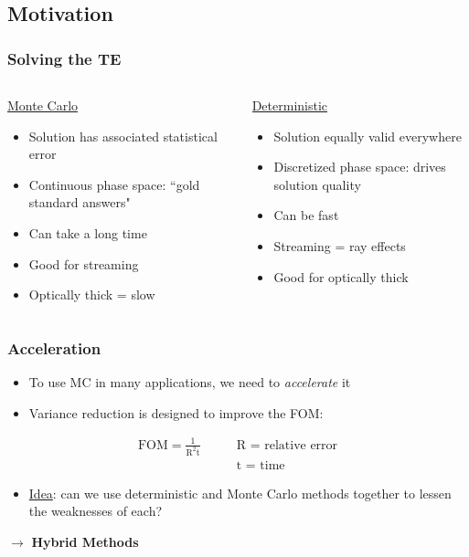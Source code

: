 \documentclass[xcolor=x11names,compress]{beamer}
\renewcommand{\(}{\begin{columns}}
\renewcommand{\)}{\end{columns}}
\newcommand{\<}[1]{\begin{column}{#1}}
\renewcommand{\>}{\end{column}}
\begin{document}
\subsection{Motivation}
\begin{frame}[fragile]
  \frametitle{Solving the TE}

\begin{columns}
  \begin{column}{0.5\textwidth}
  \begin{center}
  \underline{Monte Carlo}
  \end{center}
	\begin{itemize}
	\item Solution has associated statistical error
	\item Continuous phase space: ``gold standard answers"
	\item Can take a long time
	\item Good for streaming
	\item Optically thick = slow
	\end{itemize}
  \end{column}
  \begin{column}{0.5\textwidth}
  \begin{center}
  \underline{Deterministic}
  \end{center}
	\begin{itemize}
	\item Solution equally valid everywhere
	\item Discretized phase space: drives solution quality
	\item Can be fast
	\item Streaming = ray effects
	\item Good for optically thick
	\end{itemize}
  \end{column}
\end{columns}

\end{frame}

\begin{frame}[fragile]
  \frametitle{Acceleration}
  \begin{itemize}
  	\item To use MC in many applications, we need to \textit{accelerate} it
	\item Variance reduction is designed to improve the FOM:
  \end{itemize}
\begin{align}
\text{FOM} = \frac{1}{\text{R}^2\text{t}} \qquad & \text{R = relative error} \nonumber \\ 
& \text{t = time} \nonumber 
\end{align}
  \begin{itemize}
  	\item \underline{Idea}: can we use deterministic and Monte Carlo methods together to lessen the weaknesses of each?
  \end{itemize}
  $\rightarrow$ \textbf{Hybrid Methods}

\end{frame}
\end{document}
